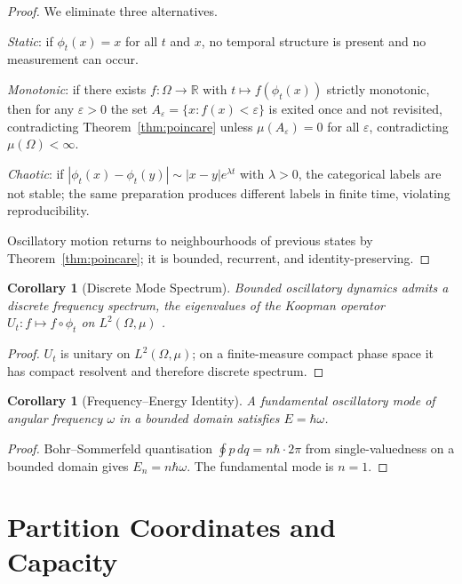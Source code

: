 \documentclass[twocolumn,10pt,a4paper]{article}
\theoremstyle{thmstyle}
\newtheorem{corollary}[theorem]{Corollary}
\theoremstyle{definition}
\theoremstyle{remark}
\newcommand{\R}{\mathbb{R}}
\begin{document}
\begin{proof}
We eliminate three alternatives.

\emph{Static}: if $\phi_{t}(x)=x$ for all $t$ and $x$, no temporal
structure is present and no measurement can occur.

\emph{Monotonic}: if there exists $f:\Omega\to\R$ with
$t\mapsto f(\phi_{t}(x))$ strictly monotonic, then for any
$\varepsilon>0$ the set $A_{\varepsilon}=\{x:f(x)<\varepsilon\}$ is
exited once and not revisited, contradicting
Theorem~\ref{thm:poincare} unless $\mu(A_{\varepsilon})=0$ for all
$\varepsilon$, contradicting $\mu(\Omega)<\infty$.

\emph{Chaotic}: if
$|\phi_{t}(x)-\phi_{t}(y)|\sim|x-y|e^{\lambda t}$ with $\lambda>0$,
the categorical labels are not stable; the same preparation produces
different labels in finite time, violating reproducibility.

Oscillatory motion returns to neighbourhoods of previous states by
Theorem~\ref{thm:poincare}; it is bounded, recurrent, and
identity-preserving.
\end{proof}

\begin{corollary}[Discrete Mode Spectrum]
\label{cor:modes}
Bounded oscillatory dynamics admits a discrete frequency spectrum,
the eigenvalues of the Koopman operator $U_{t}:f\mapsto f\circ\phi_{t}$
on $L^{2}(\Omega,\mu)$ \citep{koopman1931}.
\end{corollary}

\begin{proof}
$U_{t}$ is unitary on $L^{2}(\Omega,\mu)$; on a finite-measure compact
phase space it has compact resolvent and therefore discrete spectrum.
\end{proof}

\begin{corollary}[Frequency--Energy Identity]
\label{cor:Ehbar}
A fundamental oscillatory mode of angular frequency $\omega$ in a
bounded domain satisfies $E=\hbar\omega$.
\end{corollary}

\begin{proof}
Bohr--Sommerfeld quantisation
$\oint p\,dq=n\hbar\cdot 2\pi$ from single-valuedness on a bounded
domain \citep{bohr1913,landau1976} gives $E_{n}=n\hbar\omega$. The
fundamental mode is $n=1$.
\end{proof}

\section{Partition Coordinates and Capacity}
\label{sec:partition}
\end{document}
